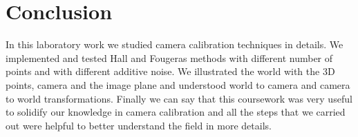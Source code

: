\documentclass[a4paper, 10pt]{article}
\begin{document}
\section*{Conclusion}
In this laboratory work we studied camera calibration techniques in details. We implemented and tested Hall and Fougeras methods with different number of points and with different additive noise. We illustrated the world with the 3D points, camera and the image plane and understood world to camera and camera to world transformations. Finally we can say that this coursework was very useful to solidify our knowledge in camera calibration and all the steps that we carried out were helpful to better understand the field in more details.
\end{document}
